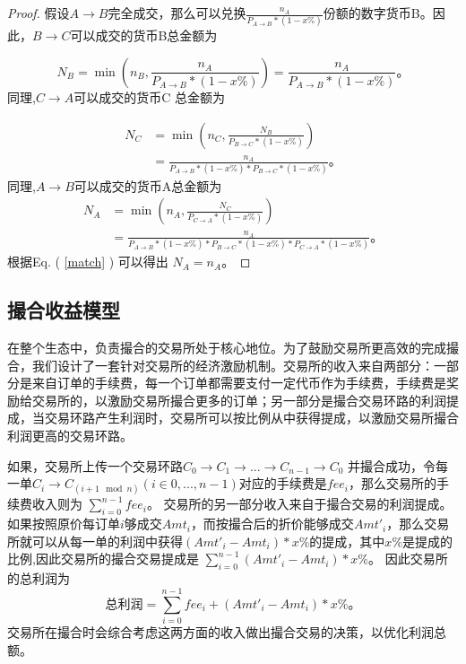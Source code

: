 \documentclass[UTF8,nofonts]{ctexart}
\newtheorem{proof}{证明} [section]
\begin{document}
\begin{proof}
假设$A \rightarrow B$完全成交，那么可以兑换$\frac{n_{A}}{P_{A \rightarrow B}*(1-x\%)}$份额的数字货币B。因此，$B \rightarrow C$可以成交的货币B总金额为

$$N_{B}=\min(n_{B},\frac{n_{A}}{P_{A \rightarrow B}*(1-x\%)})=\frac{n_{A}}{P_{A \rightarrow B}*(1-x\%)}\text{。}$$
同理,$C \rightarrow A$可以成交的货币C 总金额为

\[ \begin{split}
N_{C}&=\min(n_{C},\frac{N_{B}}{P_{B \rightarrow C}*(1-x\%)})\\
&=\frac{n_{A}}{P_{A \rightarrow B}*(1-x\%)*P_{B \rightarrow C}*(1-x\%)}\text{。}
\end{split} \]
同理,$A \rightarrow B$可以成交的货币A总金额为
\[ \begin{split}
N_{A}&=\min(n_{A},\frac{N_{C}}{P_{C \rightarrow A}*(1-x\%)})\\
&=\frac{n_{A}}{P_{A \rightarrow B}*(1-x\%)*P_{B \rightarrow C}*(1-x\%)*P_{C \rightarrow A}*(1-x\%)}\text{。}
\end{split} \]
根据Eq. ( \ref{match} ) 可以得出 $N_{A}=n_{A}$。
\end{proof}

\subsection{撮合收益模型}
在整个生态中，负责撮合的交易所处于核心地位。为了鼓励交易所更高效的完成撮合，我们设计了一套针对交易所的经济激励机制。交易所的收入来自两部分：一部分是来自订单的手续费，每一个订单都需要支付一定代币作为手续费，手续费是奖励给交易所的，以激励交易所撮合更多的订单；另一部分是撮合交易环路的利润提成，当交易环路产生利润时，交易所可以按比例从中获得提成，以激励交易所撮合利润更高的交易环路。

如果，交易所上传一个交易环路$C_0 \rightarrow C_1 \rightarrow ... \rightarrow C_{n-1} \rightarrow C_{0}$ 并撮合成功，令每一单$C_{i}\rightarrow C_{(i+1\mod n)}$$(i\in{0,...,n-1})$对应的手续费是$fee_{i}$，那么交易所的手续费收入则为
$
\sum^{n-1}_{i=0}fee_{i}\text{。}
$
交易所的另一部分收入来自于撮合交易的利润提成。如果按照原价每订单$i$够成交$Amt_{i}$，而按撮合后的折价能够成交$Amt'_{i}$，那么交易所就可以从每一单的利润中获得$(Amt'_{i}-Amt_{i})*x\%$的提成，其中$x\%$是提成的比例,因此交易所的撮合交易提成是
$
\sum^{n-1}_{i=0}(Amt'_{i}-Amt_{i})*x\%\text{。}
$
因此交易所的总利润为
$$
\text{总利润} = \sum^{n-1}_{i=0}fee_{i}+(Amt'_{i}-Amt_{i})*x\%\text{。}
$$
交易所在撮合时会综合考虑这两方面的收入做出撮合交易的决策，以优化利润总额。
\end{document}

